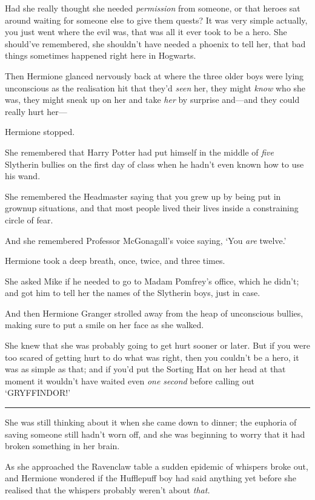 Had she really thought she needed \emph{permission} from someone, or
that heroes sat around waiting for someone else to give them quests? It
was very simple actually, you just went where the evil was, that was all
it ever took to be a hero. She should've remembered, she shouldn't have
needed a phoenix to tell her, that bad things sometimes happened right
here in Hogwarts.

Then Hermione glanced nervously back at where the three older boys were
lying unconscious as the realisation hit that they'd \emph{seen} her,
they might \emph{know} who she was, they might sneak up on her and take
\emph{her} by surprise and---and they could really hurt her---

Hermione stopped.

She remembered that Harry Potter had put himself in the middle of
\emph{five} Slytherin bullies on the first day of class when he hadn't
even known how to use his wand.

She remembered the Headmaster saying that you grew up by being put in
grownup situations, and that most people lived their lives inside a
constraining circle of fear.

And she remembered Professor McGonagall's voice saying, `You \emph{are}
twelve.'

Hermione took a deep breath, once, twice, and three times.

She asked Mike if he needed to go to Madam Pomfrey's office, which he
didn't; and got him to tell her the names of the Slytherin boys, just in
case.

And then Hermione Granger strolled away from the heap of unconscious
bullies, making sure to put a smile on her face as she walked.

She knew that she was probably going to get hurt sooner or later. But if
you were too scared of getting hurt to do what was right, then you
couldn't be a hero, it was as simple as that; and if you'd put the
Sorting Hat on her head at that moment it wouldn't have waited even
\emph{one second} before calling out `GRYFFINDOR!'

\begin{center}\rule{3in}{0.4pt}\end{center}

She was still thinking about it when she came down to dinner; the
euphoria of saving someone still hadn't worn off, and she was beginning
to worry that it had broken something in her brain.

As she approached the Ravenclaw table a sudden epidemic of whispers
broke out, and Hermione wondered if the Hufflepuff boy had said anything
yet before she realised that the whispers probably weren't about
\emph{that.}

